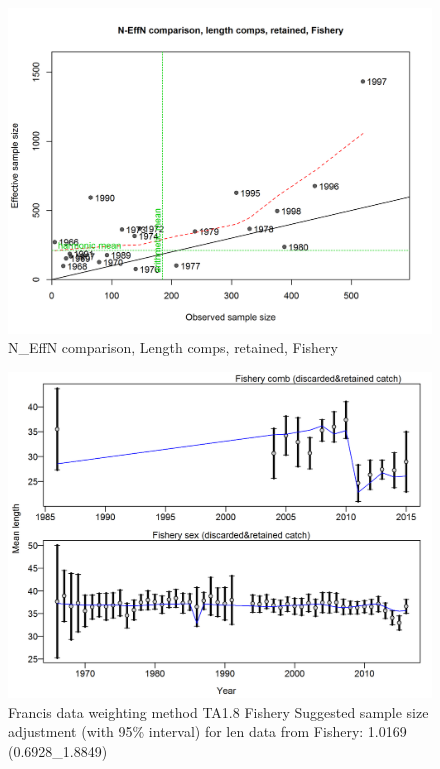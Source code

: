 \documentclass[12pt,]{article}
\begin{document}
\begin{figure}
\centering
\includegraphics{./r4ss/plots_mod1/comp_lenfit_sampsize_flt1mkt2.png}
\caption{N\_EffN comparison, Length comps, retained, Fishery
\label{fig:mod1_8_comp_lenfit_sampsize_flt1mkt2}}
\end{figure}

\begin{figure}
\centering
\includegraphics{./r4ss/plots_mod1/comp_lenfit_data_weighting_TA1.8_Fishery.png}
\caption{Francis data weighting method TA1.8 Fishery Suggested sample
size adjustment (with 95\% interval) for len data from Fishery: 1.0169
(0.6928\_1.8849)
\label{fig:mod1_9_comp_lenfit_data_weighting_TA1.8_Fishery}}
\end{figure}
\end{document}
